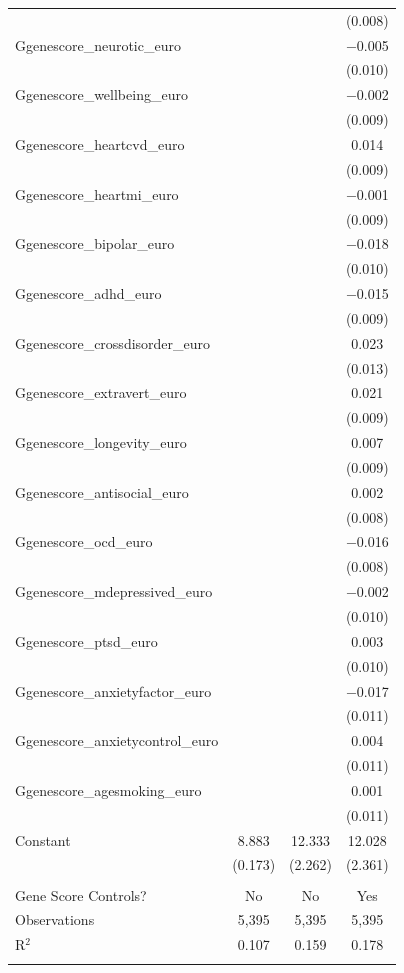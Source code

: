 \begin{tabular}{@{\extracolsep{5pt}}lccc}
  &  &  & (0.008) \\ 
  Ggenescore\_neurotic\_euro &  &  & $-$0.005 \\ 
  &  &  & (0.010) \\ 
  Ggenescore\_wellbeing\_euro &  &  & $-$0.002 \\ 
  &  &  & (0.009) \\ 
  Ggenescore\_heartcvd\_euro &  &  & 0.014 \\ 
  &  &  & (0.009) \\ 
  Ggenescore\_heartmi\_euro &  &  & $-$0.001 \\ 
  &  &  & (0.009) \\ 
  Ggenescore\_bipolar\_euro &  &  & $-$0.018 \\ 
  &  &  & (0.010) \\ 
  Ggenescore\_adhd\_euro &  &  & $-$0.015 \\ 
  &  &  & (0.009) \\ 
  Ggenescore\_crossdisorder\_euro &  &  & 0.023 \\ 
  &  &  & (0.013) \\ 
  Ggenescore\_extravert\_euro &  &  & 0.021 \\ 
  &  &  & (0.009) \\ 
  Ggenescore\_longevity\_euro &  &  & 0.007 \\ 
  &  &  & (0.009) \\ 
  Ggenescore\_antisocial\_euro &  &  & 0.002 \\ 
  &  &  & (0.008) \\ 
  Ggenescore\_ocd\_euro &  &  & $-$0.016 \\ 
  &  &  & (0.008) \\ 
  Ggenescore\_mdepressived\_euro &  &  & $-$0.002 \\ 
  &  &  & (0.010) \\ 
  Ggenescore\_ptsd\_euro &  &  & 0.003 \\ 
  &  &  & (0.010) \\ 
  Ggenescore\_anxietyfactor\_euro &  &  & $-$0.017 \\ 
  &  &  & (0.011) \\ 
  Ggenescore\_anxietycontrol\_euro &  &  & 0.004 \\ 
  &  &  & (0.011) \\ 
  Ggenescore\_agesmoking\_euro &  &  & 0.001 \\ 
  &  &  & (0.011) \\ 
  Constant & 8.883 & 12.333 & 12.028 \\ 
  & (0.173) & (2.262) & (2.361) \\ 
 \hline \\[-1.8ex] 
Gene Score Controls? & No & No & Yes \\ 
Observations & 5,395 & 5,395 & 5,395 \\ 
R$^{2}$ & 0.107 & 0.159 & 0.178 \\ 
\hline 
\hline \\[-1.8ex] 
\end{tabular} 
